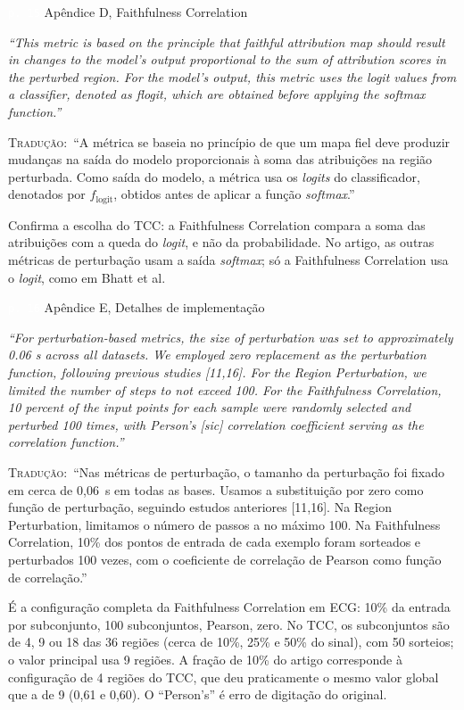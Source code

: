 \documentclass[11pt,a4paper]{article}
\newcommand{\pagechip}[1]{{\setlength{\fboxsep}{1.5pt}\colorbox{cAcc}{\textcolor{white}{\scriptsize\texttt{#1}}}}}
\newenvironment{origquote}{\par\itshape\small}{\par}
\newenvironment{tradquote}{\par\small\textsc{Tradução:}\ }{\par}
\newcommand{\explab}[1]{\par\smallskip{\small\color{cAcc}\textbf{\MakeUppercase{#1}}}\par}
\begin{document}
\begin{citacard}{\pagechip{p. 15} Apêndice D, Faithfulness Correlation}
\begin{origquote}“This metric is based on the principle that faithful attribution map should result in changes to the model’s output proportional to the sum of attribution scores in the perturbed region. For the model’s output, this metric uses the logit values from a classifier, denoted as flogit, which are obtained before applying the softmax function.”\end{origquote}
\begin{tradquote}“A métrica se baseia no princípio de que um mapa fiel deve produzir mudanças na saída do modelo proporcionais à soma das atribuições na região perturbada. Como saída do modelo, a métrica usa os \textit{logits} do classificador, denotados por $f_{\text{logit}}$, obtidos antes de aplicar a função \textit{softmax}.”\end{tradquote}
\explab{Explicação}
Confirma a escolha do TCC: a Faithfulness Correlation compara a soma das atribuições com a queda do \textit{logit}, e não da probabilidade. No artigo, as outras métricas de perturbação usam a saída \textit{softmax}; só a Faithfulness Correlation usa o \textit{logit}, como em Bhatt et al.
\end{citacard}

\begin{citacard}{\pagechip{p. 16} Apêndice E, Detalhes de implementação}
\begin{origquote}“For perturbation-based metrics, the size of perturbation was set to approximately 0.06 s across all datasets. We employed zero replacement as the perturbation function, following previous studies [11,16]. For the Region Perturbation, we limited the number of steps to not exceed 100. For the Faithfulness Correlation, 10 percent of the input points for each sample were randomly selected and perturbed 100 times, with Person’s [sic] correlation coefficient serving as the correlation function.”\end{origquote}
\begin{tradquote}“Nas métricas de perturbação, o tamanho da perturbação foi fixado em cerca de 0,06~s em todas as bases. Usamos a substituição por zero como função de perturbação, seguindo estudos anteriores [11,16]. Na Region Perturbation, limitamos o número de passos a no máximo 100. Na Faithfulness Correlation, 10\% dos pontos de entrada de cada exemplo foram sorteados e perturbados 100 vezes, com o coeficiente de correlação de Pearson como função de correlação.”\end{tradquote}
\explab{Explicação}
É a configuração completa da Faithfulness Correlation em ECG: 10\% da entrada por subconjunto, 100 subconjuntos, Pearson, zero. No TCC, os subconjuntos são de 4, 9 ou 18 das 36 regiões (cerca de 10\%, 25\% e 50\% do sinal), com 50 sorteios; o valor principal usa 9 regiões. A fração de 10\% do artigo corresponde à configuração de 4 regiões do TCC, que deu praticamente o mesmo valor global que a de 9 (0,61 e 0,60). O “Person’s” é erro de digitação do original.
\end{citacard}
\end{document}
